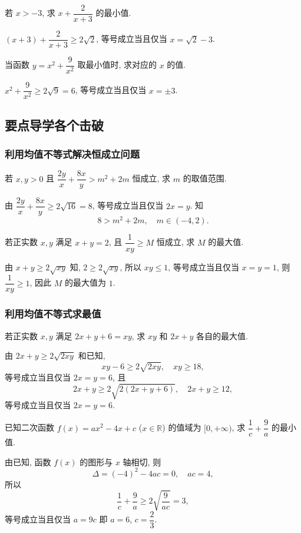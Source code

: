 \begin{exercise}
    若 $x>-3$, 求 $x+\dfrac2{x+3}$ 的最小值.
\end{exercise}
\beginsolution
    $(x+3)+\dfrac2{x+3}\geqslant 2\sqrt2$, 等号成立当且仅当 $x= \sqrt2-3$.
\endsolution

\begin{exercise}
    当函数 $y=x^2 +\dfrac9{x^2}$ 取最小值时, 求对应的 $x$ 的值.
\end{exercise}
\beginsolution
    $x^2 +\dfrac9{x^2}\geqslant 2\sqrt{9}= 6$, 等号成立当且仅当 $x= \pm3$.
\endsolution

\subsection{要点导学\quad 各个击破}

\subsubsection{利用均值不等式解决恒成立问题}
\begin{example}
    若 $x,y>0$ 且 $\dfrac{2y}x+ \dfrac{8x}y> m^2+2m$ 恒成立, 求 $m$ 的取值范围.
\end{example}
\beginsolution
    由 $\dfrac{2y}x+ \dfrac{8x}y\geqslant 2\sqrt{16}= 8$, 等号成立当且仅当 $2x= y$. 知
    \[8> m^2+2m,\quad m\in(-4,2).\]
\endsolution

\lianxi
\begin{exercise}[s]
    若正实数 $x,y$ 满足 $x+y=2$, 且 $\dfrac1{xy}\geqslant M$ 恒成立, 求 $M$ 的最大值.
\end{exercise}
\beginsolution
    由 $x+y\geqslant 2\sqrt{xy}$ 知, $2\geqslant 2\sqrt{xy}$, 所以 $xy\leqslant 1$, 等号成立当且仅当 $x= y= 1$, 则 $\dfrac1{xy}\geqslant 1$, 因此 $M$ 的最大值为 $1$.
\endsolution

\subsubsection{利用均值不等式求最值}
\begin{example}
    若正实数 $x,y$ 满足 $2x+y+6=xy$, 求 $xy$ 和 $2x+y$ 各自的最大值.
\end{example}
\beginsolution
    由 $2x+y\geqslant 2\sqrt{2xy}$ 和已知,
    \[xy-6\geqslant 2\sqrt{2xy},\quad xy\geqslant 18,\]
    等号成立当且仅当 $2x=y= 6$, 且
    \[2x+y\geqslant 2\sqrt{2(2x+y+6)},\quad 2x+y\geqslant 12,\]
    等号成立当且仅当 $2x=y= 6$.
\endsolution

\begin{example}
    已知二次函数 $f(x)=ax^2 -4x+c$ ($x\in\mathbb{R}$) 的值域为 $[0,+\infty)$, 求 $\dfrac1c +\dfrac9a$ 的最小值.
\end{example}
\beginsolution
    由已知, 函数 $f(x)$ 的图形与 $x$ 轴相切, 则
    \[\Delta= (-4)^2- 4ac= 0,\quad ac=4,\]
    所以
    \[\frac1c +\frac9a\geqslant 2\sqrt{\frac{9}{ac}}= 3,\]
    等号成立当且仅当 $a=9c$ 即 $a= 6$, $c= \dfrac23$.
\endsolution

